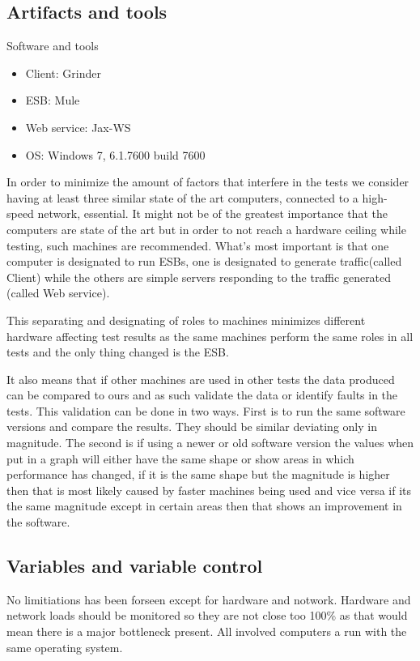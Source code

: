 \subsection{Artifacts and tools}
\begin{table}[H]
	\caption{Software and tools}
	\begin{itemize}
		\item Client: Grinder \cite{whatisgrinder, kod}
		\item ESB: Mule \cite{whatismule, kod}
		\item Web service: Jax-WS \cite{whatisjaxws, kod}
		\item OS: Windows 7, 6.1.7600 build 7600
	\end{itemize}
\end{table}
In order to minimize the amount of factors that interfere in the tests we consider having at least three similar state of the art computers, connected to a high-speed network, essential.
It might not be of the greatest importance that the computers are state of the art but in order to not reach a hardware ceiling while testing, such machines are recommended. 
What's most important is that one computer is designated to run ESBs, one is designated to generate traffic(called Client) while the others are simple servers responding to the traffic generated (called Web service). 

This separating and designating of roles to machines minimizes different hardware affecting test results as the same machines perform the same roles in all tests and the only thing changed is the ESB. 

It also means that if other machines are used in other tests the data produced can be compared to ours and as such validate the data or identify faults in the tests. 
This validation can be done in two ways. 
First is to run the same software versions and compare the results. 
They should be similar deviating only in magnitude. The second is if using a newer or old software version the values when put in a graph will either have the same shape or show areas in which performance has changed, 
if it is the same shape but the magnitude is higher then that is most likely caused by faster machines being used and vice versa if its the same magnitude except in certain areas then that shows an improvement in the software.

\subsection{Variables and variable control}
No limitiations has been forseen except for hardware and notwork.
Hardware and network loads should be monitored so they are not close too 100\% as that would mean there is a major bottleneck present. 
All involved computers a run with the same operating system.
